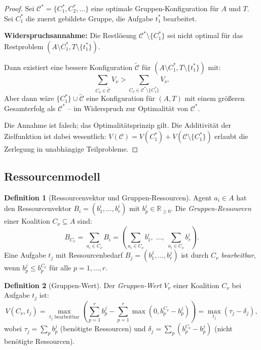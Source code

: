 ﻿\documentclass[a4paper,12pt]{article}
\theoremstyle{definition}
\newtheorem{definition}{Definition}
\begin{document}
\begin{proof}
    Sei $\mathcal{C}^* = \{C_1^*, C_2^*, \ldots\}$ eine optimale
    Gruppen-Konfiguration f\"{u}r $A$ und $T$. Sei $C_1^*$ die zuerst gebildete
    Gruppe, die Aufgabe $t_1^*$ bearbeitet.

    \textbf{Widerspruchsannahme:} Die Restl\"{o}sung $\mathcal{C}^* \setminus \{C_1^*\}$
    sei nicht optimal f\"{u}r das Restproblem $(A \setminus C_1^*, T \setminus \{t_1^*\})$.

    Dann existiert eine bessere Konfiguration $\tilde{\mathcal{C}}$ f\"{u}r
    $(A \setminus C_1^*, T \setminus \{t_1^*\})$ mit:
    \[
        \sum_{C_\nu \in \tilde{\mathcal{C}}} V_\nu
        > \sum_{C_\nu \in \mathcal{C}^* \setminus \{C_1^*\}} V_\nu.
    \]
    Aber dann w\"{a}re $\{C_1^*\} \cup \tilde{\mathcal{C}}$ eine Konfiguration f\"{u}r
    $(A, T)$ mit einem gr\"{o}{\ss}eren Gesamterfolg als $\mathcal{C}^*$ -- im
    Widerspruch zur Optimalit\"{a}t von $\mathcal{C}^*$.

    Die Annahme ist falsch; das Optimalit\"{a}tsprinzip gilt.
    Die Additivit\"{a}t der Zielfunktion ist dabei wesentlich:
    $V(\mathcal{C}) = V(C_1^*) + V(\mathcal{C} \setminus \{C_1^*\})$
    erlaubt die Zerlegung in unabh\"{a}ngige Teilprobleme. \qedhere
\end{proof}

\subsection{Ressourcenmodell}

\begin{definition}[Ressourcenvektor und Gruppen-Ressourcen]
    Agent $a_i \in A$ hat den Ressourcenvektor $B_i = (b_1^i, \ldots, b_r^i)$
    mit $b_p^i \in \mathbb{R}_{\geq 0}$. Die \emph{Gruppen-Ressourcen} einer
    Koalition $C_\nu \subseteq A$ sind:
    \[
        B_{C_\nu} = \sum_{a_i \in C_\nu} B_i
        = \left(\sum_{a_i \in C_\nu} b_1^i,\; \ldots,\; \sum_{a_i \in C_\nu} b_r^i\right).
    \]
    Eine Aufgabe $t_j$ mit Ressourcenbedarf $B_j = (b_1^j, \ldots, b_r^j)$
    ist durch $C_\nu$ \emph{bearbeitbar}, wenn $b_p^j \leq b_p^{C_\nu}$
    f\"{u}r alle $p = 1, \ldots, r$.
\end{definition}

\begin{definition}[Gruppen-Wert]
    Der \emph{Gruppen-Wert} $V_\nu$ einer Koalition $C_\nu$ bei Aufgabe $t_j$ ist:
    \[
        V(C_\nu, t_j) = \max_{t_j \text{ bearbeitbar}} \left(
            \sum_{p=1}^r b_p^j - \sum_{p=1}^r \max(0, b_p^{C_\nu} - b_p^j)
        \right)
        = \max_{t_j} \left(\tau_j - \delta_j\right),
    \]
    wobei $\tau_j = \sum_p b_p^j$ (ben\"{o}tigte Ressourcen) und
    $\delta_j = \sum_p (b_p^{C_\nu} - b_p^j)$ (nicht ben\"{o}tigte Ressourcen).
\end{definition}
\end{document}
